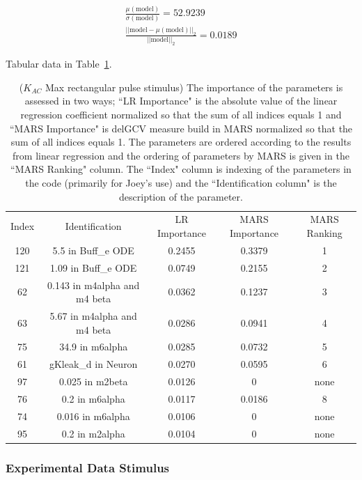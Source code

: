 \documentclass[12pt]{article}
\numberwithin{equation}{section}
\begin{document}
\begin{eqnarray*}
\frac{\mu(\text{model})}{\sigma(\text{model})} = 52.9239\\
\frac{\vert \vert \text{model}-\mu(\text{model}) \vert \vert_2 }{\vert \vert \text{model}\vert \vert_2 } = 0.0189
\end{eqnarray*}

Tabular data in Table~\ref{qoi_K_AC_Max_rec}.

\begin{table}[h]
\centering
\begin{tabular}{ccccc}
Index & Identification & LR Importance & MARS Importance & MARS Ranking \\
120 & 5.5 in Buff\_e ODE & 0.2455 & 0.3379 & 1\\
121 & 1.09 in Buff\_e ODE & 0.0749 & 0.2155 & 2\\
62 & 0.143 in m4alpha and m4 beta &  0.0362 & 0.1237 & 3\\
63 &   5.67 in m4alpha and m4 beta & 0.0286 & 0.0941 & 4\\
75 & 34.9 in m6alpha & 0.0285 & 0.0732 & 5\\
61 & gKleak\_d in Neuron & 0.0270 & 0.0595 & 6\\
97 & 0.025 in m2beta & 0.0126 & 0 & none\\
76 & 0.2 in m6alpha & 0.0117 &  0.0186 & 8\\
74 & 0.016 in m6alpha & 0.0106 & 0 & none\\
95 & 0.2 in m2alpha & 0.0104 & 0 & none\\
\end{tabular}
\caption{ ($K_{AC}$ Max rectangular pulse stimulus) The importance of the parameters is assessed in two ways; ``LR Importance" is the absolute value of the linear regression coefficient normalized so that the sum of all indices equals 1 and ``MARS Importance" is delGCV measure build in MARS normalized so that the sum of all indices equals 1. The parameters are ordered according to the results from linear regression and the ordering of parameters by MARS is given in the ``MARS Ranking" column. The ``Index" column is indexing of the parameters in the code (primarily for Joey's use) and the ``Identification column" is the description of the parameter.}
\label{qoi_K_AC_Max_rec}
\end{table}

\newpage

\subsubsection{Experimental Data Stimulus}
\end{document}
